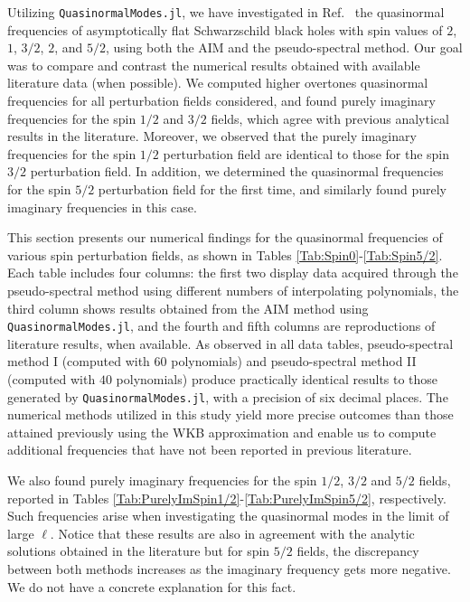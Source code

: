 Utilizing \texttt{QuasinormalModes.jl}, we have investigated in Ref.~\cite{Mamani2022} the quasinormal frequencies of asymptotically flat Schwarzschild black holes with spin values of $2$, $1$, $3/2$, $2$, and $5/2$, using both the \ac{AIM} and the pseudo-spectral method. Our goal was to compare and contrast the numerical results obtained with available literature data (when possible). We computed higher overtones quasinormal frequencies for all perturbation fields considered, and found purely imaginary frequencies for the spin $1/2$ and $3/2$ fields, which agree with previous analytical results in the literature. Moreover, we observed that the purely imaginary frequencies for the spin $1/2$ perturbation field are identical to those for the spin $3/2$ perturbation field. In addition, we determined the quasinormal frequencies for the spin $5/2$ perturbation field for the first time, and similarly found purely imaginary frequencies in this case.

This section presents our numerical findings for the quasinormal frequencies of various spin perturbation fields, as shown in Tables \ref{Tab:Spin0}-\ref{Tab:Spin5/2}. Each table includes four columns: the first two display data acquired through the pseudo-spectral method using different numbers of interpolating polynomials, the third column shows results obtained from the \ac{AIM} method using \texttt{QuasinormalModes.jl}, and the fourth and fifth columns are reproductions of literature results, when available. As observed in all data tables, pseudo-spectral method I (computed with $60$ polynomials) and pseudo-spectral method II (computed with $40$ polynomials) produce practically identical results to those generated by \texttt{QuasinormalModes.jl}, with a precision of six decimal places. The numerical methods utilized in this study yield more precise outcomes than those attained previously using the WKB approximation and enable us to compute additional frequencies that have not been reported in previous literature.

We also found purely imaginary frequencies for the spin $1/2$, $3/2$ and $5/2$ fields, reported in Tables \ref{Tab:PurelyImSpin1/2}-\ref{Tab:PurelyImSpin5/2}, respectively. Such frequencies arise when investigating the quasinormal modes in the limit of large $\ell$. Notice that these results are also in agreement with the analytic solutions obtained in the literature but for spin $5/2$ fields, the discrepancy between both methods increases as the imaginary frequency gets more negative. We do not have a concrete explanation for this fact.

